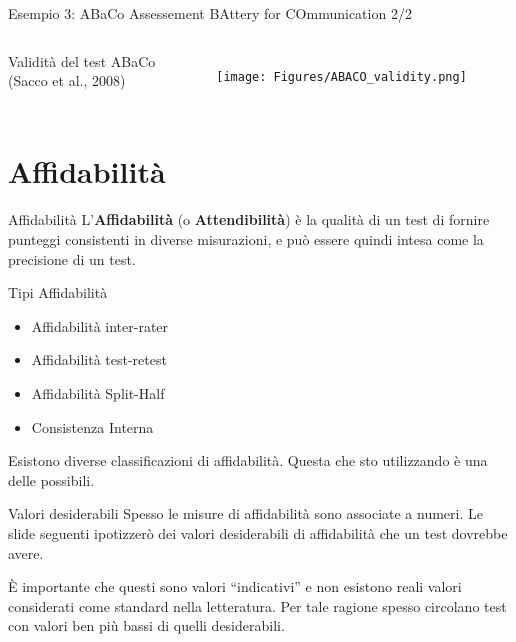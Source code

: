 \documentclass[
  ignorenonframetext,
]{beamer}
\providecommand{\tightlist}{%
  \setlength{\itemsep}{0pt}\setlength{\parskip}{0pt}}
\begin{document}
\begin{frame}{Esempio 3:
{\small ABaCo Assessement BAttery for COmmunication} 2/2}
\label{esempio-3-22}
\begin{columns}
\small
Validità del test ABaCo\\ (Sacco et al., 2008)

\begin{figure}
\texttt{[image: Figures/ABACO\_validity.png]}
\end{figure}
\end{columns}
\end{frame}

\section{Affidabilità}\label{affidabilituxe0}

\begin{frame}{Affidabilità}
\label{affidabilituxe0-1}
L'\textbf{Affidabilità} (o \textbf{Attendibilità}) è la qualità di un
test di fornire punteggi consistenti in diverse misurazioni, e può
essere quindi intesa come la precisione di un test.
\end{frame}

\begin{frame}{Tipi Affidabilità}
\label{tipi-affidabilituxe0}
\begin{itemize}
\tightlist
\item
  Affidabilità inter-rater
\item
  Affidabilità test-retest
\item
  Affidabilità Split-Half
\item
  Consistenza Interna
\end{itemize}

Esistono diverse classificazioni di affidabilità. Questa che sto
utilizzando è una delle possibili.
\end{frame}

\begin{frame}{Valori desiderabili}
\label{valori-desiderabili}
Spesso le misure di affidabilità sono associate a numeri. Le slide
seguenti ipotizzerò dei valori desiderabili di affidabilità che un test
dovrebbe avere.

È importante che questi sono valori ``indicativi'' e non esistono reali
valori considerati come standard nella letteratura. Per tale ragione
spesso circolano test con valori ben più bassi di quelli desiderabili.
\end{frame}
\end{document}
